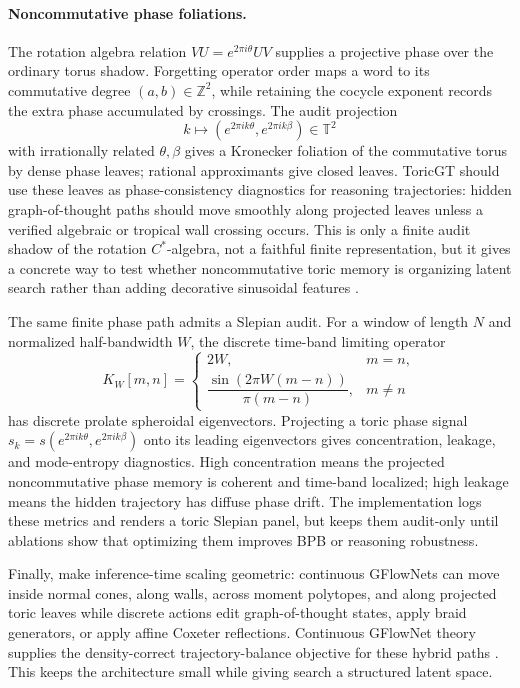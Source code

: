 \documentclass[10pt]{article}
\theoremstyle{definition}
\theoremstyle{plain}
\theoremstyle{remark}
\begin{document}
\paragraph{Noncommutative phase foliations.}
The rotation algebra relation $VU=e^{2\pi i\theta}UV$ supplies a projective phase over the ordinary torus shadow.  Forgetting operator order maps a word to its commutative degree $(a,b)\in\mathbb Z^2$, while retaining the cocycle exponent records the extra phase accumulated by crossings.  The audit projection
\begin{equation}
  k\longmapsto \left(e^{2\pi i k\theta},e^{2\pi i k\beta}\right)\in\mathbb T^2
\end{equation}
with irrationally related $\theta,\beta$ gives a Kronecker foliation of the commutative torus by dense phase leaves; rational approximants give closed leaves.  ToricGT should use these leaves as phase-consistency diagnostics for reasoning trajectories: hidden graph-of-thought paths should move smoothly along projected leaves unless a verified algebraic or tropical wall crossing occurs.  This is only a finite audit shadow of the rotation $C^*$-algebra, not a faithful finite representation, but it gives a concrete way to test whether noncommutative toric memory is organizing latent search rather than adding decorative sinusoidal features \cite{rieffel1981rotation}.

The same finite phase path admits a Slepian audit.  For a window of length $N$ and normalized half-bandwidth $W$, the discrete time-band limiting operator
\begin{equation}
  K_W[m,n]=
  \begin{cases}
    2W,&m=n,\\
    \dfrac{\sin(2\pi W(m-n))}{\pi(m-n)},&m\ne n
  \end{cases}
\end{equation}
has discrete prolate spheroidal eigenvectors.  Projecting a toric phase signal $s_k=s(e^{2\pi i k\theta},e^{2\pi i k\beta})$ onto its leading eigenvectors gives concentration, leakage, and mode-entropy diagnostics.  High concentration means the projected noncommutative phase memory is coherent and time-band localized; high leakage means the hidden trajectory has diffuse phase drift.  The implementation logs these metrics and renders a toric Slepian panel, but keeps them audit-only until ablations show that optimizing them improves BPB or reasoning robustness.

Finally, make inference-time scaling geometric: continuous GFlowNets can move inside normal cones, along walls, across moment polytopes, and along projected toric leaves while discrete actions edit graph-of-thought states, apply braid generators, or apply affine Coxeter reflections.  Continuous GFlowNet theory supplies the density-correct trajectory-balance objective for these hybrid paths \cite{lahlou2023continuous}.  This keeps the architecture small while giving search a structured latent space.
\end{document}
